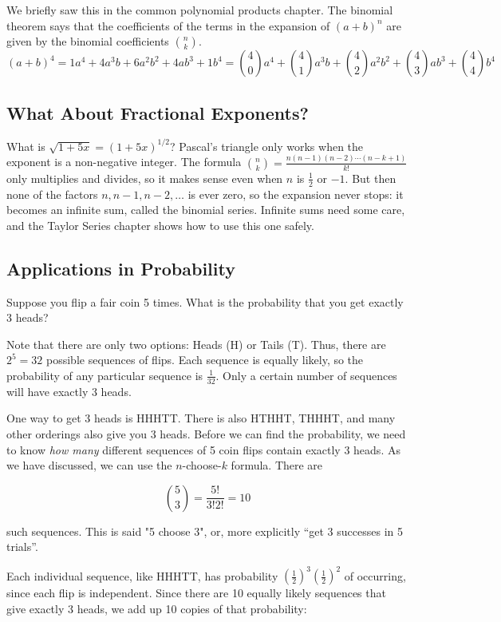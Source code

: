 We briefly saw this in the common polynomial products chapter. The binomial theorem says that the coefficients of the terms in the expansion of $(a + b)^n$ are given by the binomial coefficients ${n \choose k}$.
\begin{equation*}
(a + b)^4 = 1a^4 + 4a^3b + 6a^2 b^2 + 4 a b^3 + 1 b^4 =\binom{4}{0}a^4 + \binom{4}{1}a^3b + \binom{4}{2}a^2b^2 + \binom{4}{3}ab^3 + \binom{4}{4}b^4
\end{equation*}
\subsection{What About Fractional Exponents?}
What is $\sqrt{1+5x} = (1 + 5x)^{1/2}$? Pascal's triangle only works when the exponent is a non-negative
integer. The formula $\binom{n}{k} = \frac{n(n-1)(n-2)\cdots(n-k+1)}{k!}$ only multiplies and divides, so it
makes sense even when $n$ is $\frac{1}{2}$ or $-1$. But then none of the factors $n, n-1, n-2, \ldots$ is ever
zero, so the expansion never stops: it becomes an infinite sum, called the binomial
series. Infinite sums need some care, and the Taylor Series chapter shows how to use this one safely.

\subsection{Applications in Probability}

Suppose you flip a fair coin 5 times. What is the probability that you get exactly 3 heads? 

Note that there are only two options: Heads (H) or Tails (T). Thus, there are $2^5 = 32$ possible sequences of flips. Each sequence is equally likely, so the probability of any particular sequence is $\frac{1}{32}$. Only a certain number of sequences will have exactly 3 heads.

One way to get 3 heads is HHHTT. There is also HTHHT, THHHT, and many other orderings also give you 3 heads. Before we can find the probability, we need to know \textit{how many} different sequences of 5 coin flips contain exactly 3 heads. As we have discussed, we can use the $n$-choose-$k$ formula. There are

$$\binom{5}{3} = \frac{5!}{3!2!} = 10$$

such sequences. This is said "5 choose 3", or, more explicitly ``get 3 successes in 5 trials''. 

Each individual sequence, like HHHTT, has probability $\left(\frac{1}{2}\right)^3\left(\frac{1}{2}\right)^2$ of occurring, since each flip is independent. Since there are 10 equally likely sequences that give exactly 3 heads, we add up 10 copies of that probability:

